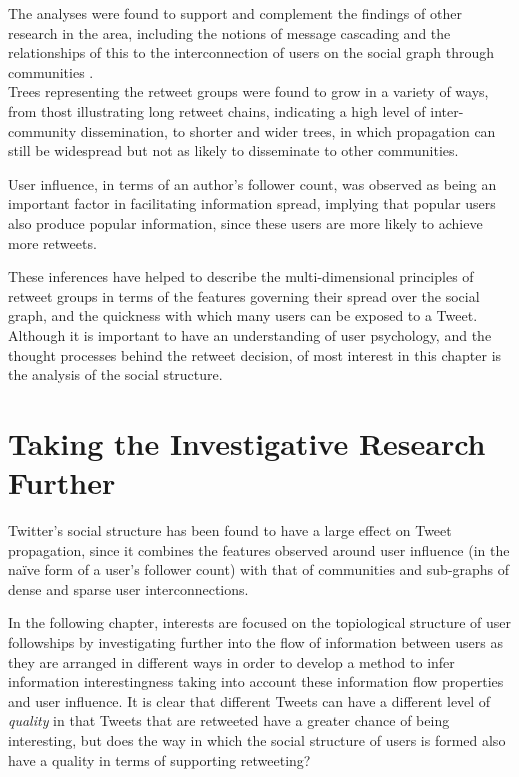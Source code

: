 The analyses were found to support and complement the findings of other research in the area, including the notions of message cascading \cite{galuba10} and the relationships of this to the interconnection of users on the social graph through communities \cite{java07}.\\
Trees representing the retweet groups were found to grow in a variety of ways, from thost illustrating long retweet chains, indicating a high level of inter-community dissemination, to shorter and wider trees, in which propagation can still be widespread but not as likely to disseminate to other communities.

User influence, in terms of an author's follower count, was observed as being an important factor in facilitating information spread, implying that popular users also produce popular information, since these users are more likely to achieve more retweets.

These inferences have helped to describe the multi-dimensional principles of retweet groups in terms of the features governing their spread over the social graph, and the quickness with which many users can be exposed to a Tweet. Although it is important to have an understanding of user psychology, and the thought processes behind the retweet decision, of most interest in this chapter is the analysis of the social structure.


\section{Taking the Investigative Research Further}
Twitter's social structure has been found to have a large effect on Tweet propagation, since it combines the features observed around user influence (in the na{\"i}ve form of a user's follower count) with that of communities and sub-graphs of dense and sparse user interconnections.

In the following chapter, interests are focused on the topiological structure of user followships by investigating further into the flow of information between users as they are arranged in different ways in order to develop a method to infer information interestingness taking into account these information flow properties and user influence. It is clear that different Tweets can have a different level of \textit{quality} in that Tweets that are retweeted have a greater chance of being interesting, but does the way in which the social structure of users is formed also have a quality in terms of supporting retweeting?


